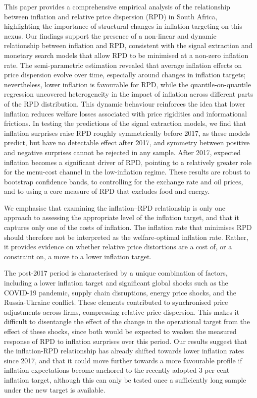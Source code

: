 \documentclass[
  letterpaper,
  DIV=11,
  numbers=noendperiod]{scrartcl}
\begin{document}
This paper provides a comprehensive empirical analysis of the
relationship between inflation and relative price dispersion (RPD) in
South Africa, highlighting the importance of structural changes in
inflation targeting on this nexus. Our findings support the presence of
a non-linear and dynamic relationship between inflation and RPD,
consistent with the signal extraction and monetary search models that
allow RPD to be minimised at a non-zero inflation rate. The
semi-parametric estimation revealed that average inflation effects on
price dispersion evolve over time, especially around changes in
inflation targets; nevertheless, lower inflation is favourable for RPD,
while the quantile-on-quantile regression uncovered heterogeneity in the
impact of inflation across different parts of the RPD distribution. This
dynamic behaviour reinforces the idea that lower inflation reduces
welfare losses associated with price rigidities and informational
frictions. In testing the predictions of the signal extraction models,
we find that inflation surprises raise RPD roughly symmetrically before
2017, as these models predict, but have no detectable effect after 2017,
and symmetry between positive and negative surprises cannot be rejected
in any sample. After 2017, expected inflation becomes a significant
driver of RPD, pointing to a relatively greater role for the menu-cost
channel in the low-inflation regime. These results are robust to
bootstrap confidence bands, to controlling for the exchange rate and oil
prices, and to using a core measure of RPD that excludes food and
energy.

We emphasise that examining the inflation--RPD relationship is only one
approach to assessing the appropriate level of the inflation target, and
that it captures only one of the costs of inflation. The inflation rate
that minimises RPD should therefore not be interpreted as the
welfare-optimal inflation rate. Rather, it provides evidence on whether
relative price distortions are a cost of, or a constraint on, a move to
a lower inflation target.

The post-2017 period is characterised by a unique combination of
factors, including a lower inflation target and significant global
shocks such as the COVID-19 pandemic, supply chain disruptions, energy
price shocks, and the Russia-Ukraine conflict. These elements
contributed to synchronised price adjustments across firms, compressing
relative price dispersion. This makes it difficult to disentangle the
effect of the change in the operational target from the effect of these
shocks, since both would be expected to weaken the measured response of
RPD to inflation surprises over this period. Our results suggest that
the inflation-RPD relationship has already shifted towards lower
inflation rates since 2017, and that it could move further towards a
more favourable profile if inflation expectations become anchored to the
recently adopted 3 per cent inflation target, although this can only be
tested once a sufficiently long sample under the new target is
available.
\end{document}
